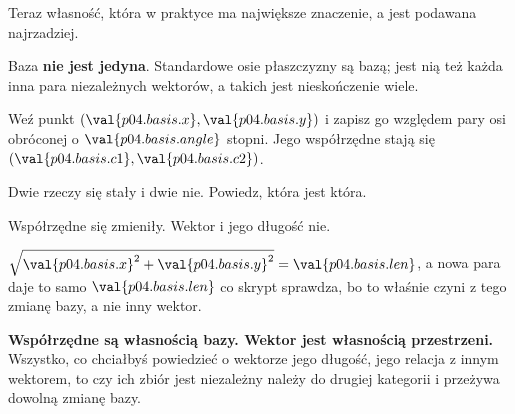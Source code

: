 \begin{fr}
Teraz własność, która w praktyce ma największe znaczenie, a jest podawana
najrzadziej.

Baza \textbf{nie jest jedyna}. Standardowe osie płaszczyzny są bazą; jest nią
też każda inna para niezależnych wektorów, a takich jest nieskończenie wiele.

Weź punkt $(\val{p04.basis.x}, \val{p04.basis.y})$ i zapisz go względem pary
osi obróconej o $\val{p04.basis.angle}$ stopni. Jego współrzędne stają się
$(\val{p04.basis.c1}, \val{p04.basis.c2})$.

Dwie rzeczy się stały i dwie nie. Powiedz, która jest która.
\nextframe
\end{fr}

\begin{fr}
\begin{ansblock}
Współrzędne się zmieniły. Wektor i jego długość nie.
\end{ansblock}

$\sqrt{\val{p04.basis.x}^{2} + \val{p04.basis.y}^{2}} = \val{p04.basis.len}$, a
nowa para daje to samo $\val{p04.basis.len}$ \dash{} co skrypt sprawdza, bo to
właśnie czyni z tego zmianę bazy, a nie inny wektor.

\textbf{Współrzędne są własnością bazy. Wektor jest własnością przestrzeni.}
Wszystko, co chciałbyś powiedzieć o wektorze \dash{} jego długość, jego relacja
z innym wektorem, to czy ich zbiór jest niezależny \dash{} należy do drugiej
kategorii i przeżywa dowolną zmianę bazy.
\end{fr}


